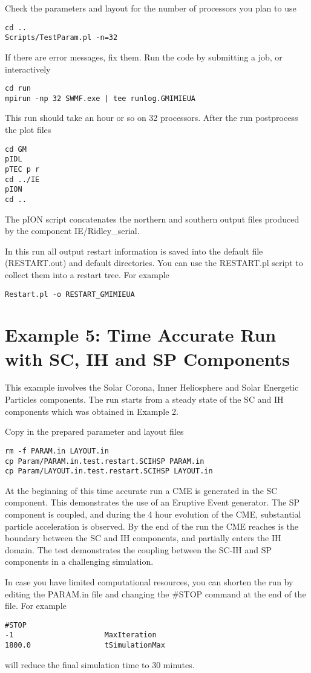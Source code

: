 Check the parameters and layout for the number of processors you plan to use
\begin{verbatim}
cd ..
Scripts/TestParam.pl -n=32
\end{verbatim}
If there are error messages, fix them. 
Run the code by submitting a job, or interactively
\begin{verbatim}
cd run
mpirun -np 32 SWMF.exe | tee runlog.GMIMIEUA
\end{verbatim}
This run should take an hour or so on 32 processors.
After the run postprocess the plot files
\begin{verbatim}
cd GM
pIDL
pTEC p r
cd ../IE
pION
cd ..
\end{verbatim}
The pION script concatenates the northern and southern output files
produced by the component IE/Ridley\_serial.

In this run all output restart information is saved into the
default file (RESTART.out) and default directories.
You can use the RESTART.pl script to collect them into a restart tree.
For example
\begin{verbatim}
Restart.pl -o RESTART_GMIMIEUA
\end{verbatim}

\section{Example 5: Time Accurate Run with SC, IH and SP Components}

This example involves the Solar Corona, Inner Heliosphere
and Solar Energetic Particles components.
The run starts from a steady state of the SC and IH components
which was obtained in Example 2.

Copy in the prepared parameter and layout files
\begin{verbatim}
rm -f PARAM.in LAYOUT.in
cp Param/PARAM.in.test.restart.SCIHSP PARAM.in
cp Param/LAYOUT.in.test.restart.SCIHSP LAYOUT.in
\end{verbatim}
At the beginning of this time accurate run a CME is 
generated in the SC component. This demonstrates the
use of an Eruptive Event generator.
The SP component is coupled, and during the 4 hour evolution
of the CME, substantial particle acceleration is observed. 
By the end of the run the CME reaches is the boundary 
between the SC and IH components, and partially enters the IH domain.
The test demonstrates the coupling between the SC-IH and SP
components in a challenging simulation.

In case you have limited computational resources, you can 
shorten the run by editing the PARAM.in file and changing
the \#STOP command at the end of the file. For example 
\begin{verbatim}
#STOP
-1                     MaxIteration
1800.0                 tSimulationMax
\end{verbatim}
will reduce the final simulation time to 30 minutes.

